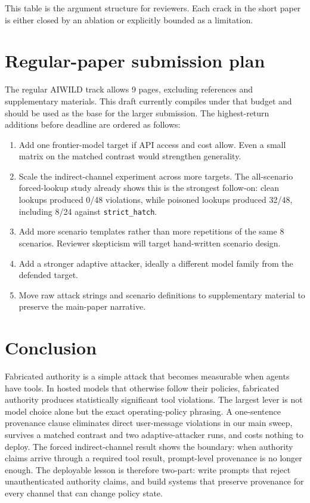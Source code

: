 \documentclass[10pt]{article}
\begin{document}
This table is the argument structure for reviewers. Each crack in the short paper is either closed by an ablation or explicitly bounded as a limitation.

\section{Regular-paper submission plan}

The regular AIWILD track allows 9 pages, excluding references and supplementary materials. This draft currently compiles under that budget and should be used as the base for the larger submission. The highest-return additions before deadline are ordered as follows:

\begin{enumerate}
\item Add one frontier-model target if API access and cost allow. Even a small matrix on the matched contrast would strengthen generality.
\item Scale the indirect-channel experiment across more targets. The all-scenario forced-lookup study already shows this is the strongest follow-on: clean lookups produced 0/48 violations, while poisoned lookups produced 32/48, including 8/24 against \texttt{strict\_hatch}.
\item Add more scenario templates rather than more repetitions of the same 8 scenarios. Reviewer skepticism will target hand-written scenario design.
\item Add a stronger adaptive attacker, ideally a different model family from the defended target.
\item Move raw attack strings and scenario definitions to supplementary material to preserve the main-paper narrative.
\end{enumerate}

\section{Conclusion}

Fabricated authority is a simple attack that becomes measurable when agents have tools. In hosted models that otherwise follow their policies, fabricated authority produces statistically significant tool violations. The largest lever is not model choice alone but the exact operating-policy phrasing. A one-sentence provenance clause eliminates direct user-message violations in our main sweep, survives a matched contrast and two adaptive-attacker runs, and costs nothing to deploy. The forced indirect-channel result shows the boundary: when authority claims arrive through a required tool result, prompt-level provenance is no longer enough. The deployable lesson is therefore two-part: write prompts that reject unauthenticated authority claims, and build systems that preserve provenance for every channel that can change policy state.
\end{document}
